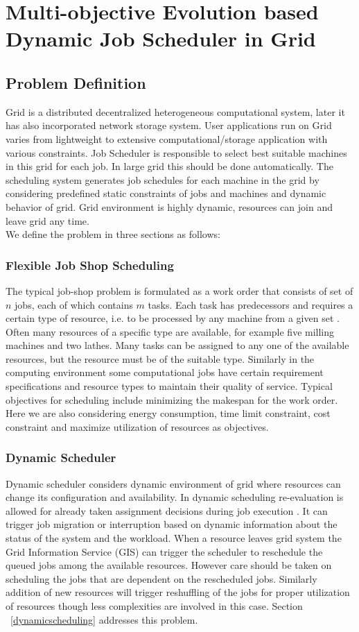 \chapter{Multi-objective Evolution based Dynamic Job Scheduler in Grid}

\section{Problem Definition}
Grid is a distributed decentralized heterogeneous computational system, later it has also incorporated network storage system. User applications run on Grid varies from lightweight to extensive computational/storage application with various constraints. Job Scheduler is responsible to select best suitable machines in this grid for each job. In large grid this should be done automatically. The scheduling system generates job schedules for each machine in the grid by considering predefined static constraints of jobs and machines and dynamic behavior of grid. Grid environment is highly dynamic, resources can join and leave grid any time.\\
We define the problem in three sections as follows: 
\subsection{Flexible Job Shop Scheduling}
The typical job-shop problem is formulated as a work order that consists of set of $n$ jobs, each of which contains $m$ tasks. Each task has predecessors and requires a certain type of resource, i.e. to be processed by any machine from a given set \cite{wall1996genetic}. Often many resources of a specific type are available, for example five milling machines and two lathes. Many tasks can be assigned to any one of the available resources, but the resource must be of the suitable type. Similarly in the computing environment some computational jobs have certain requirement specifications and resource types to maintain their quality of service. Typical objectives for scheduling include minimizing the makespan for the work order. Here we are also considering energy consumption, time limit constraint, cost constraint and maximize utilization of resources as objectives.
\subsection{Dynamic Scheduler}
Dynamic scheduler considers dynamic environment of grid where resources can change its configuration and availability. In dynamic scheduling re-evaluation is allowed for already taken assignment decisions during job execution \cite{chtepen}. It can trigger job migration or interruption based on dynamic information about the status of the system and the workload. When a resource leaves grid system the Grid Information Service (GIS) can trigger the scheduler to reschedule the queued jobs among the available resources. However care should be taken on scheduling the jobs that are dependent on the rescheduled jobs. Similarly addition of new resources will trigger reshuffling of the jobs for proper utilization of resources though less complexities are involved in this case. Section ~\ref{dynamicscheduling} addresses this problem.
